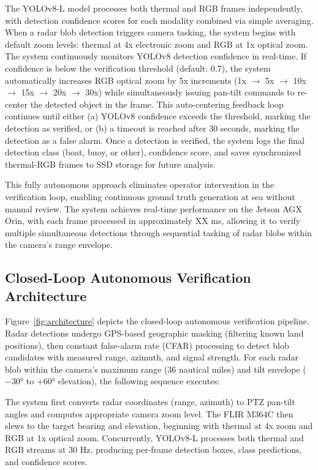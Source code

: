 \documentclass[conf]{asmeconf}
\begin{document}
The YOLOv8-L model processes both thermal and RGB frames independently, with detection confidence scores for each modality combined via simple averaging. When a radar blob detection triggers camera tasking, the system begins with default zoom levels: thermal at 4x electronic zoom and RGB at 1x optical zoom. The system continuously monitors YOLOv8 detection confidence in real-time. If confidence is below the verification threshold (default: 0.7), the system automatically increases RGB optical zoom by 5x increments (1x $\to$ 5x $\to$ 10x $\to$ 15x $\to$ 20x $\to$ 30x) while simultaneously issuing pan-tilt commands to re-center the detected object in the frame. This auto-centering feedback loop continues until either (a) YOLOv8 confidence exceeds the threshold, marking the detection as verified, or (b) a timeout is reached after 30 seconds, marking the detection as a false alarm. Once a detection is verified, the system logs the final detection class (boat, buoy, or other), confidence score, and saves synchronized thermal-RGB frames to SSD storage for future analysis.

This fully autonomous approach eliminates operator intervention in the verification loop, enabling continuous ground truth generation at sea without manual review. The system achieves real-time performance on the Jetson AGX Orin, with each frame processed in approximately XX ms, allowing it to verify multiple simultaneous detections through sequential tasking of radar blobs within the camera's range envelope.

\subsection{Closed-Loop Autonomous Verification Architecture}

Figure~\ref{fig:architecture} depicts the closed-loop autonomous verification pipeline. Radar detections undergo GPS-based geographic masking (filtering known land positions), then constant false-alarm rate (CFAR) processing to detect blob candidates with measured range, azimuth, and signal strength. For each radar blob within the camera's maximum range (36 nautical miles) and tilt envelope ($-30°$ to $+60°$ elevation), the following sequence executes:

The system first converts radar coordinates (range, azimuth) to PTZ pan-tilt angles and computes appropriate camera zoom level. The FLIR M364C then slews to the target bearing and elevation, beginning with thermal at 4x zoom and RGB at 1x optical zoom. Concurrently, YOLOv8-L processes both thermal and RGB streams at 30 Hz, producing per-frame detection boxes, class predictions, and confidence scores.
\end{document}
